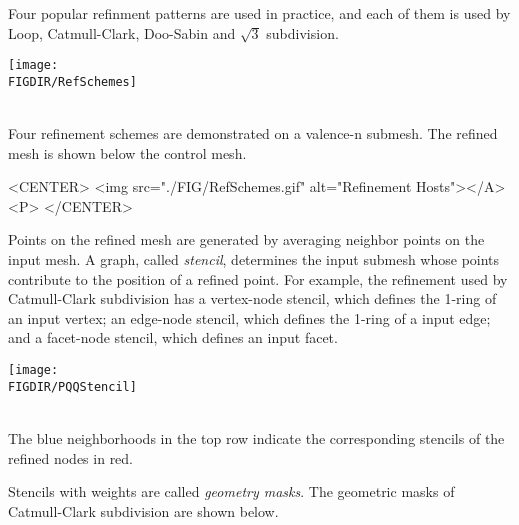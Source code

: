 Four popular refinment patterns are used in practice, and each of them
is used by Loop, Catmull-Clark\cite{cgal:cc-rgbss-78}, Doo-Sabin 
and $\sqrt{3}$ subdivision.

\begin{ccTexOnly}
  \begin{center}
    \parbox{0.6\textwidth}{%
      \texttt{[image: \\FIGDIR/RefSchemes]}%
    }\\ \vspace{0.5cm}
    Four refinement schemes are demonstrated on a valence-n submesh.
    The refined mesh is shown below the control mesh.
  \end{center}
\end{ccTexOnly}

\begin{ccHtmlOnly}
  <CENTER>
     <img src="./FIG/RefSchemes.gif" alt="Refinement Hosts"></A><P>
  </CENTER>
\end{ccHtmlOnly}

Points on the refined mesh are generated by averaging
neighbor points on the input mesh. A graph, called \emph{stencil}, 
determines the input submesh whose points contribute to the 
position of a refined point. 
For example, the 
refinement used by Catmull-Clark subdivision has a vertex-node stencil, 
which defines the 1-ring of an input vertex; an edge-node stencil, 
which defines the 1-ring of a input edge; and a facet-node stencil, 
which defines an input facet.

\begin{ccTexOnly}
  \begin{center}
    \parbox{0.5\textwidth}{%
      \texttt{[image: \\FIGDIR/PQQStencil]}%
    }\\ \vspace{0.5cm}
    The blue neighborhoods in the top row indicate the corresponding
    stencils of the refined nodes in red. 
  \end{center}
\end{ccTexOnly}

Stencils with weights are called \emph{geometry masks}.
The geometric masks of Catmull-Clark subdivision are shown below.


